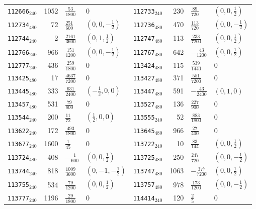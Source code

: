 {\begin{longtable}{@{}lrll@{\hspace{2em}}lrll@{}}
\texttt{112666}$_{240}$ & 1052 & $\tfrac{53}{1800}$ & 0 & \texttt{112733}$_{240}$ & 230 & $\tfrac{89}{720}$ & $(0,0,\tfrac{1}{2})$\\
\texttt{112734}$_{480}$ & 72 & $\tfrac{251}{600}$ & $(0,0,-\tfrac{1}{2})$ & \texttt{112736}$_{480}$ & 470 & $\tfrac{113}{720}$ & $(0,0,-\tfrac{1}{2})$\\
\texttt{112744}$_{240}$ & 2 & $\tfrac{2161}{3600}$ & $(0,1,\tfrac{1}{2})$ & \texttt{112747}$_{480}$ & 113 & $\tfrac{233}{7200}$ & $(0,0,\tfrac{1}{2})$\\
\texttt{112766}$_{240}$ & 966 & $\tfrac{151}{1200}$ & $(0,0,-\tfrac{1}{2})$ & \texttt{112767}$_{480}$ & 642 & $-\tfrac{43}{1200}$ & $(0,0,\tfrac{1}{2})$\\
\texttt{112777}$_{240}$ & 436 & $\tfrac{259}{1800}$ & 0 & \texttt{113424}$_{480}$ & 115 & $\tfrac{539}{1440}$ & 0\\
\texttt{113425}$_{480}$ & 17 & $\tfrac{4637}{7200}$ & 0 & \texttt{113427}$_{480}$ & 371 & $\tfrac{551}{7200}$ & 0\\
\texttt{113445}$_{480}$ & 333 & $\tfrac{631}{2400}$ & $(-\tfrac{1}{2},0,0)$ & \texttt{113447}$_{480}$ & 591 & $-\tfrac{43}{2400}$ & $(0,1,0)$\\
\texttt{113457}$_{480}$ & 531 & $\tfrac{79}{800}$ & 0 & \texttt{113527}$_{480}$ & 136 & $\tfrac{227}{900}$ & 0\\
\texttt{113544}$_{240}$ & 200 & $\tfrac{11}{72}$ & $(\tfrac{1}{2},0,0)$ & \texttt{113555}$_{240}$ & 52 & $\tfrac{883}{1800}$ & 0\\
\texttt{113622}$_{240}$ & 172 & $\tfrac{493}{1800}$ & 0 & \texttt{113645}$_{480}$ & 966 & $\tfrac{27}{400}$ & 0\\
\texttt{113677}$_{240}$ & 1600 & $\tfrac{1}{45}$ & 0 & \texttt{113722}$_{240}$ & 10 & $\tfrac{83}{144}$ & $(0,0,\tfrac{1}{2})$\\
\texttt{113724}$_{480}$ & 408 & $-\tfrac{1}{600}$ & $(0,0,\tfrac{1}{2})$ & \texttt{113725}$_{480}$ & 250 & $\tfrac{247}{720}$ & $(0,0,-\tfrac{1}{2})$\\
\texttt{113744}$_{240}$ & 818 & $\tfrac{1009}{3600}$ & $(0,-1,-\tfrac{1}{2})$ & \texttt{113747}$_{480}$ & 1063 & $-\tfrac{377}{7200}$ & $(0,0,\tfrac{1}{2})$\\
\texttt{113755}$_{240}$ & 534 & $\tfrac{79}{1200}$ & $(0,0,\tfrac{1}{2})$ & \texttt{113757}$_{480}$ & 978 & $\tfrac{173}{1200}$ & $(0,0,-\tfrac{1}{2})$\\
\texttt{113777}$_{240}$ & 1196 & $\tfrac{29}{1800}$ & 0 & \texttt{114414}$_{240}$ & 120 & $\tfrac{2}{5}$ & 0\\

\end{longtable}}
